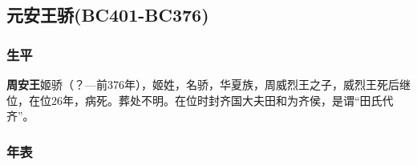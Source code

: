 
\subsection{元安王骄{\tiny(BC401-BC376)}}

\subsubsection{生平}

\textbf{周安王}姬骄（？—前376年），姬姓，名骄，华夏族，周威烈王之子，威烈王死后继位，在位26年，病死。葬处不明。在位时封齐国大夫田和为齐侯，是谓“田氏代齐”。

\subsubsection{年表}

